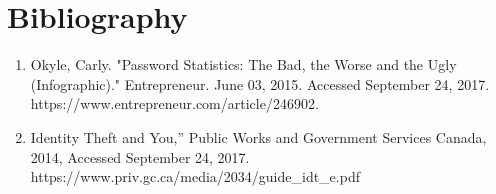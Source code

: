 \documentclass{article}
\begin{document}
\section{Bibliography}

\begin{enumerate}
    \item Okyle, Carly. "Password Statistics: The Bad, the Worse and the Ugly (Infographic)." Entrepreneur. June 03, 2015. Accessed September 24, 2017. https://www.entrepreneur.com/article/246902.
    \item Identity Theft and You,” Public Works and Government Services Canada, 2014, Accessed September 24, 2017.\\ https://www.priv.gc.ca/media/2034/guide\_idt\_e.pdf
\end{enumerate}
\end{document}
